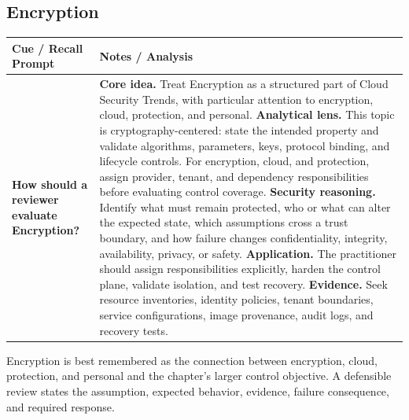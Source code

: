 \documentclass[11pt]{article}
\newcommand{\CornellHeader}{%
\rowcolor{Navy}\color{white}\bfseries Cue / Recall Prompt & \color{white}\bfseries Notes / Analysis\\\hline}
\newcommand{\CornellRow}[2]{%
\cellcolor{CueGray}\RaggedRight\textbf{#1} & \RaggedRight #2\\\hline}
\begin{document}
\subsection*{Encryption}
\begin{longtable}{>{\RaggedRight\arraybackslash}p{}|>{\RaggedRight\arraybackslash}p{}}
\CornellHeader
\CornellRow{How should a reviewer evaluate Encryption?}{\textbf{Core idea.} Treat Encryption as a structured part of Cloud Security Trends, with particular attention to encryption, cloud, protection, and personal. \textbf{Analytical lens.} This topic is cryptography-centered: state the intended property and validate algorithms, parameters, keys, protocol binding, and lifecycle controls. For encryption, cloud, and protection, assign provider, tenant, and dependency responsibilities before evaluating control coverage. \textbf{Security reasoning.} Identify what must remain protected, who or what can alter the expected state, which assumptions cross a trust boundary, and how failure changes confidentiality, integrity, availability, privacy, or safety. \textbf{Application.} The practitioner should assign responsibilities explicitly, harden the control plane, validate isolation, and test recovery. \textbf{Evidence.} Seek resource inventories, identity policies, tenant boundaries, service configurations, image provenance, audit logs, and recovery tests.}
\end{longtable}
\begin{topicsummary}
Encryption is best remembered as the connection between encryption, cloud, protection, and personal and the chapter's larger control objective. A defensible review states the assumption, expected behavior, evidence, failure consequence, and required response.
\end{topicsummary}
\end{document}
